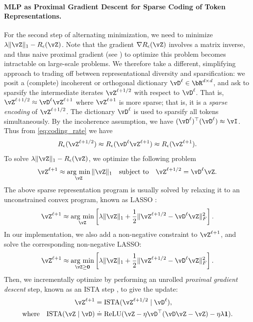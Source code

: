 \documentclass[../../book-main.tex]{subfiles}
\begin{document}
\paragraph{MLP as Proximal Gradient Descent for Sparse Coding of Token Representations.} For the second step of alternating minimization, we need to minimize $\lambda \norm{\vZ}_{1} - R_{\epsilon}(\vZ)$. Note that the gradient \(\nabla R_{\epsilon}(\vZ)\) involves a matrix inverse, and thus naive proximal gradient (see ) to optimize this problem becomes intractable on large-scale problems. %
We therefore take a different, simplifying approach to trading off between representational diversity and sparsification: we posit a (complete) incoherent or orthogonal dictionary $\vD^{\ell} \in \bR^{d \times d}$, and ask to sparsify the intermediate iterates $\vZ^{\ell + 1/2}$ with respect to \(\vD^{\ell}\). That is, $\vZ^{\ell + 1/2} \approx \vD^{\ell} \vZ^{\ell + 1}$ where $\vZ^{\ell + 1}$ is more sparse; that is, it is a \textit{sparse encoding} of \(\vZ^{\ell + 1/2}\). The dictionary \(\vD^{\ell}\) is used to sparsify all tokens simultaneously. 
By the incoherence assumption, we have $(\vD^{\ell})^\top(\vD^{\ell}) \approx \vI$. Thus from \eqref{eq:coding_rate} we have 
\begin{equation}
    R_{\epsilon}(\vZ^{\ell + 1/2}) \approx R_{\epsilon}(\vD^{\ell}\vZ^{\ell + 1}) \approx R_{\epsilon}(\vZ^{\ell + 1}).
\end{equation}  
To solve $\lambda \norm{\vZ}_{1} - R_{\epsilon}(\vZ)$, we optimize the following problem
\begin{align*}
       \vZ^{\ell + 1} \approx \argmin_{\vZ}  \norm{\vZ}_1 \quad \mbox{subject to} \quad \vZ^{\ell + 1/2} = \vD^{\ell}\vZ.
\end{align*}
{The above sparse representation program is usually solved by relaxing it to an unconstrained convex program, known as LASSO \citep{Wright-Ma-2022}:} 
\begin{equation}
    \vZ^{\ell + 1} \approx \argmin_{\vZ} \left[\lambda \norm{\vZ}_1 + \frac{1}{2}\norm{\vZ^{\ell + 1/2} - \vD^{\ell} \vZ}_F^2 \right].
\end{equation}
In our implementation, we also add a non-negative constraint to $\vZ^{\ell + 1}$, and solve the corresponding non-negative LASSO:
\begin{equation}
    \vZ^{\ell + 1} \approx \argmin_{\vZ \geq \bm 0} \left[\lambda\norm{\vZ}_1 + \frac{1}{2}\norm{\vZ^{\ell + 1/2} - \vD^{\ell} \vZ}_{F}^{2}\right].
    \label{eq:sparse-nonnegative}
\end{equation}
Then, we incrementally optimize  by performing an unrolled {\em proximal gradient descent} step, known as an ISTA step \citep{beck2009fast}, to give the update:
\begin{align}\label{eq:ista-block}
    \vZ^{\ell + 1} 
    &= \mathrm{ISTA}({\vZ^{\ell + 1/2} \mid \vD^{\ell}}), \\
    \text{where} \quad \mathrm{ISTA}({\vZ \mid \vD}) 
    &\doteq \operatorname{ReLU}(\vZ - \eta \vD^\top(\vD\vZ - \vZ) - \eta \lambda \bm{1}).
\end{align}
\end{document}
